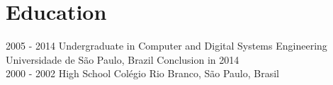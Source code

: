 \documentclass[]{friggeri-cv}
\begin{document}
\section{Education}
\begin{entrylist}
  \entry
    {2005 - 2014}
    {Undergraduate in Computer and Digital Systems Engineering\\}
    {Universidade de São Paulo, Brazil}
    {Conclusion in 2014\\
    }
  \entry
    {2000 - 2002}
    {High School}
    {Colégio Rio Branco, São Paulo, Brasil}
    {%
    }
\end{entrylist}

\end{document}
